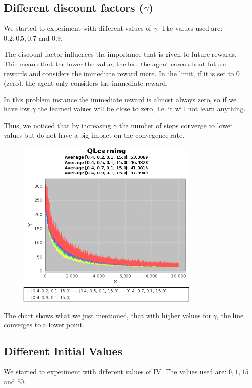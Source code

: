 \documentclass{article}
\begin{document}
\subsection{Different discount factors ($\gamma$)}
We started to experiment with different values of $\gamma$. The values used are:
$0.2, 0.5, 0.7$ and $0.9$. 

The discount factor influences the importance that is given to future rewards.
This means that the lower the value, the less the agent cares about future
rewards and considers the immediate reward more. In the limit, if it is set to $0$ (zero), the agent only considers the immediate reward.

In this problem instance the immediate reward is almost always zero, so if we
have low $\gamma$ the learned values will be close to zero, i.e. it will not
learn anything. 

Thus, we noticed that by increasing $\gamma$ the number of steps converge to
lower values but do not have a big impact on the convegence rate.

\begin{figure}[h]
\centering
\includegraphics[width=0.8\textwidth]{res/alpha_04_gama_02_to_09_epsilon_01_IV_15.png}
\end{figure}

The chart shows what we just mentioned, that with higher values for $\gamma$, the line converges to a lower point.

\subsection{Different Initial Values}
We started to experiment with different values of IV. The values used are:
$0, 1, 15$ and $50$. 
\end{document}
